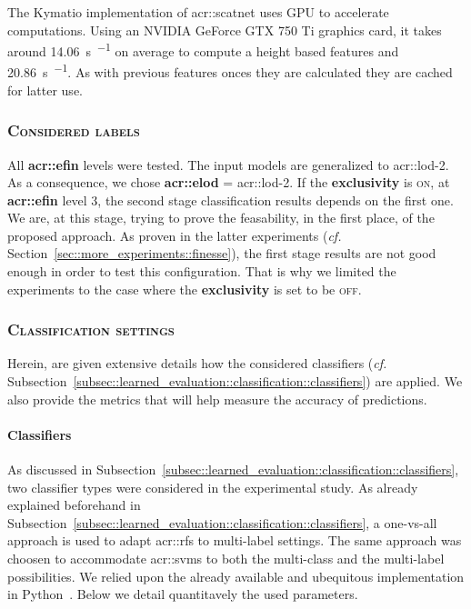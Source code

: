                     The Kymatio implementation of \gls{acr::scatnet} uses GPU to accelerate computations.
                    Using an NVIDIA GeForce GTX 750 Ti graphics card, it takes around \SI{14.06}{\s \per \building} on average to compute a height based features and \SI{20.86}{\s \per \building}.
                    As with previous features onces they are calculated they are cached for latter use.
    
        \subsubsection{\textsc{Considered labels}}
            All \textbf{\gls{acr::efin}} levels were tested.
            The input models are generalized to \gls{acr::lod}-2.
            As a consequence, we chose \textbf{\gls{acr::elod}} = \gls{acr::lod}-2.
            If the \textbf{exclusivity} is \textsc{on}, at \textbf{\gls{acr::efin}} level 3, the second stage classification results depends on the first one.
            We are, at this stage, trying to prove the feasability, in the first place, of the proposed approach.
            As proven in the latter experiments (\textit{cf.} Section~\ref{sec::more_experiments::finesse}), the first stage results are not good enough in order to test this configuration.
            That is why we limited the experiments to the case where the \textbf{exclusivity} is set to be \textsc{off}.

        \subsubsection{\textsc{Classification settings}}
            Herein, are given extensive details how the considered classifiers (\textit{cf.} Subsection~\ref{subsec::learned_evaluation::classification::classifiers}) are applied.
            We also provide the metrics that will help measure the accuracy of predictions.

            \paragraph{Classifiers}
                As discussed in Subsection~\ref{subsec::learned_evaluation::classification::classifiers}, two classifier types were considered in the experimental study.
                As already explained beforehand in Subsection~\ref{subsec::learned_evaluation::classification::classifiers}, a one-vs-all approach is used to adapt \glspl{acr::rf} to multi-label settings.
                The same approach was choosen to accommodate \glspl{acr::svm} to both the multi-class and the multi-label possibilities.
                We relied upon the already available and ubequitous implementation in Python~\parencite{scikit-learn}.
                Below we detail quantitavely the used parameters.
                

